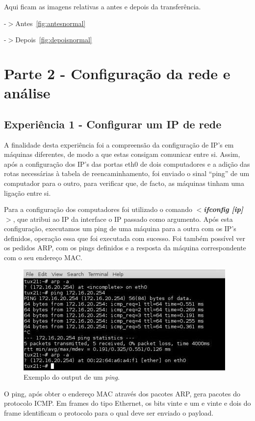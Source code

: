 \documentclass[a4paper]{article}
\begin{document}
Aqui ficam as imagens relativas a antes e depois da transferência.

-$>$Antes~\autoref{fig:antesnormal}

-$>$Depois~\autoref{fig:depoisnormal}


\section{Parte 2 - Configuração da rede e análise}
\subsection{Experiência 1 - Configurar um IP de rede}
A finalidade desta experiência foi a compreensão da configuração de IP’s em máquinas diferentes, de modo a que estas consigam comunicar entre si. Assim, após a configuração dos IP’s das portas eth0 de dois computadores e a adição das rotas necessárias à tabela de reencaminhamento, foi enviado o sinal “ping” de um computador para o outro, para verificar que, de facto, as máquinas tinham uma ligação entre si.

Para a configuração dos computadores foi utilizado o comando \textbf{\textit{$<$ifconfig [ip]$>$}}, que atribui ao IP da interface o IP passado como argumento. Após esta configuração, executamos um ping de uma máquina para a outra com os IP’s definidos, operação essa que foi executada com sucesso. Foi também possível ver os pedidos ARP, com os pings definidos e a resposta da máquina correspondente com o seu endereço MAC.

\begin{figure}[h!]
\centering
\includegraphics[scale=0.5]{res/image1.jpg}
\caption{Exemplo do output de um \emph{ping}.}
\end{figure}

O ping, após obter o endereço MAC através dos pacotes ARP, gera pacotes do protocolo ICMP. Em frames do tipo Ethernet, os bits vinte e um e vinte e dois do frame identificam o protocolo para o qual deve ser enviado o payload.
\end{document}
